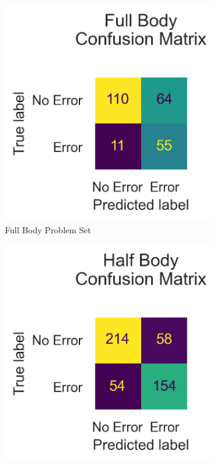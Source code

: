 \begin{figure}[!htbp]
  \centering
  \begin{subfigure}[b]{0.4\linewidth}
      \centering
      \includegraphics[width=\textwidth]{figures/Results/v1/confusion/full_together.png}
      \caption[]{Full Body Problem Set}
      \label{fig:fb_conf_v1}
  \end{subfigure}
  \hfill
  \begin{subfigure}[b]{0.4\linewidth}
      \centering
      \includegraphics[width=\textwidth]{figures/Results/v1/confusion/half_together.png}

\end{subfigure}
\end{figure}

